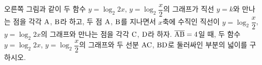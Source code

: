 \noindent\begin{minipage}[t]{0.58\linewidth}\vspace{0pt}\raggedright 오른쪽 그림과 같이 두 함수 $y=\log_2 2x$, $y=\log_2 \dfrac{x}{2}$의 그래프가 직선 $y=k$와 만나는 점을 각각 $\mathrm{A}$, $\mathrm{B}$라 하고, 두 점 $\mathrm{A}$, $\mathrm{B}$를 지나면서 $x$축에 수직인 직선이 $y=\log_2 \dfrac{x}{2}$, $y=\log_2 2x$의 그래프와 만나는 점을 각각 $\mathrm{C}$, $\mathrm{D}$라 하자. $\overline{\mathrm{AB}}=4$일 때, 두 함수 $y=\log_2 2x$, $y=\log_2 \dfrac{x}{2}$의 그래프와 두 선분 $\mathrm{AC}$, $\mathrm{BD}$로 둘러싸인 부분의 넓이를 구하시오. \end{minipage}\hfill\begin{minipage}[t]{0.4\linewidth}\vspace{0pt}\centering \resizebox{\ifdim\width>\linewidth\linewidth\else\width\fi}{!}{}\end{minipage}\par
